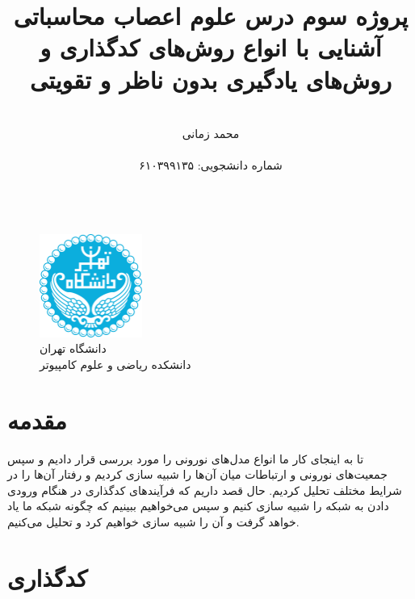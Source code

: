 \documentclass[12pt]{article}
\title{\Large پروژه سوم درس علوم اعصاب محاسباتی\\[1ex]آشنایی با انواع روش‌های کدگذاری و روش‌های یادگیری بدون ناظر و تقویتی}
\author{\\ \Large{ محمد زمانی}  \\ \\ \Large{شماره دانشجویی: ۶۱۰۳۹۹۱۳۵} \\ \\ }}
\date{}
\begin{document}

	
	\begin{titlingpage}
	
	\begin{figure}
		\centering
		\includegraphics[width=0.3\textwidth]{Figs/University_of_Tehran_logo.png}	
		\caption*{ \LARGE دانشگاه تهران\\ دانشکده ریاضی و علوم کامپیوتر \\}
	\end{figure}	\maketitle
	
	\end{titlingpage}


	\setlength{\parindent}{20pt}
	\tableofcontents
	
	\vspace{1\baselineskip}

	\pagebreak
	\section{مقدمه}
تا به اینجای کار ما انواع مدل‌های نورونی را مورد بررسی قرار دادیم و سپس جمعیت‌های نورونی و ارتباطات میان‌ آن‌ها را شبیه سازی کردیم و رفتار آن‌ها را در شرایط مختلف تحلیل کردیم. حال قصد داریم که فرآیند‌های کدگذاری در هنگام ورودی دادن به شبکه را شبیه سازی کنیم و سپس می‌خواهیم ببینیم که چگونه شبکه ما یاد خواهد گرفت و آن را شبیه سازی خواهیم کرد و تحلیل می‌کنیم.

	\section{کدگذاری}
	
	\subsection{}
	
\end{document}
